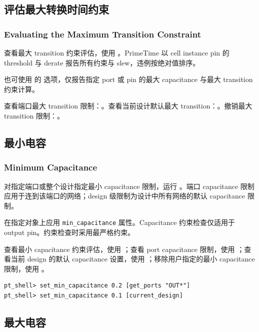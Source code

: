 \subsection{评估最大转换时间约束}
\subsubsection*{Evaluating the Maximum Transition Constraint}

查看最大 transition 约束评估，使用 。PrimeTime 以 cell instance pin 的 threshold 与 derate 报告所有约束与 slew，违例按绝对值排序。

也可使用  的  选项，仅报告指定 port 或 pin 的最大 capacitance 与最大 transition 约束计算。

查看端口最大 transition 限制：。查看当前设计默认最大 transition：。撤销最大 transition 限制：。

\subsection{最小电容}
\subsubsection*{Minimum Capacitance}

对指定端口或整个设计指定最小 capacitance 限制，运行 。端口 capacitance 限制应用于连到该端口的网络；design 级限制为设计中所有网络的默认 capacitance 限制。

 在指定对象上应用 \texttt{min\_capacitance} 属性。Capacitance 约束检查仅适用于 output pin。约束检查时采用最严格约束。

查看最小 capacitance 约束评估，使用 ；查看 port capacitance 限制，使用 ；查看当前 design 的默认 capacitance 设置，使用 ；移除用户指定的最小 capacitance 限制，使用 。

\begin{lstlisting}
pt_shell> set_min_capacitance 0.2 [get_ports "OUT*"]
pt_shell> set_min_capacitance 0.1 [current_design]
\end{lstlisting}

\subsection{最大电容}
